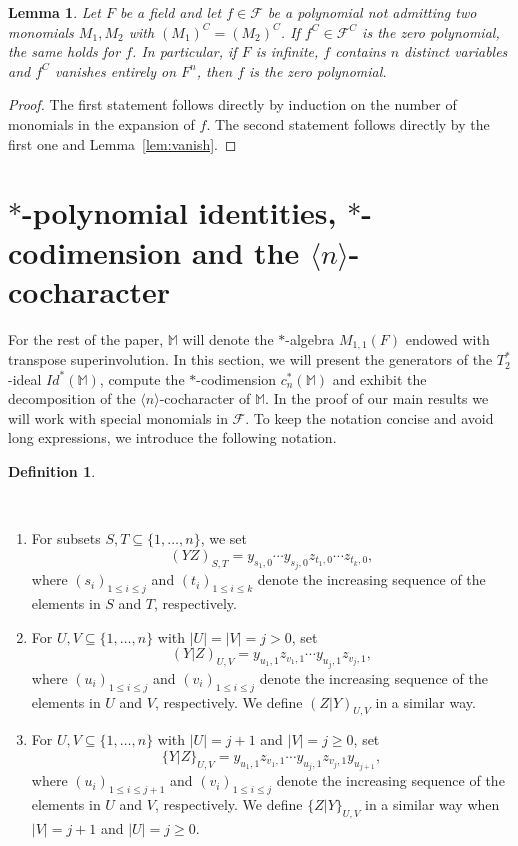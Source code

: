 \documentclass[11pt]{amsart}
\newtheorem{lemma}[theorem]{Lemma}
\theoremstyle{definition}
\newtheorem{definition}[theorem]{Definition}
\theoremstyle{remark}
\begin{document}
\begin{lemma}\label{lem:com}
		Let $F$ be a field and let $f\in \mathcal{F}$ be a polynomial not admitting two monomials $M_1, M_2$ with $(M_1)^C=(M_2)^C$. If $f^C\in \mathcal{F}^C$ is the zero polynomial, the same holds for 
		$f$. In particular, if $F$ is infinite, $f$ contains $n$ distinct variables and $f^C$ vanishes entirely on $F^n$, then $f$ is the zero polynomial.
	\end{lemma}
	\begin{proof}
		The first statement follows directly by induction on the number of monomials in the expansion of $f$. The second statement follows directly by the first one and Lemma~\ref{lem:vanish}.
	\end{proof}
	
	
	
	
	
	
	
	
	
	\section{$*$-polynomial identities, $*$-codimension and the $\langle n \rangle$-cocharacter}
	For the rest of the paper, $\mathbb M$ will denote the $*$-algebra $M_{1,1}(F)$ endowed with transpose superinvolution. In this section, we will present the generators of the $T_2^*$-ideal $Id^*(\mathbb M)$, compute the $*$-codimension $c_n^*(\mathbb M)$ and exhibit the decomposition of the $\langle n\rangle$-cocharacter of $\mathbb M$. In the proof of our main results we will work with special monomials in $\mathcal F$. To keep the notation concise and avoid long expressions, we introduce the following notation.
    
	\begin{definition}\label{def:basic}

    \
    
		\begin{enumerate}
		    \item For subsets $S, T\subseteq \{1, \ldots, n\}$, we set $$(YZ)_{S, T}=y_{s_1, 0}\cdots y_{s_j, 0}z_{t_1, 0}\cdots z_{t_k, 0},$$ 
		where $(s_i)_{1\le i\le j}$ and $(t_i)_{1\le i\le k}$ denote the increasing sequence of the elements in $S$ and $T$, respectively. 

        \item For $U, V\subseteq \{1, \ldots, n\}$ with $|U|=|V|=j>0$, set 
		$$(Y|Z)_{U, V}=y_{u_1, 1}z_{v_1, 1}\cdots y_{u_j, 1}z_{v_j, 1},$$
		where $(u_i)_{1\le i\le j}$ and $(v_i)_{1\le i\le j}$ denote the increasing sequence of the elements in $U$ and $V$, respectively. We define $(Z|Y)_{U, V}$ in a similar way.

        \item For $U, V\subseteq \{1, \ldots, n\}$ with $|U|=j+1$ and $|V|=j\ge 0$, set 
		$$\{Y|Z\}_{U, V}=y_{u_1, 1}z_{v_1, 1}\cdots y_{u_j, 1}z_{v_j, 1}y_{u_{j+1}},$$
		where $(u_i)_{1\le i\le j+1}$ and $(v_i)_{1\le i\le j}$ denote the increasing sequence of the elements in $U$ and $V$, respectively. We define $\{Z|Y\}_{U, V}$ in a similar way when $|V|=j+1$ and $|U|=j\ge 0$.
		\end{enumerate}
	\end{definition}
	
\end{document}
